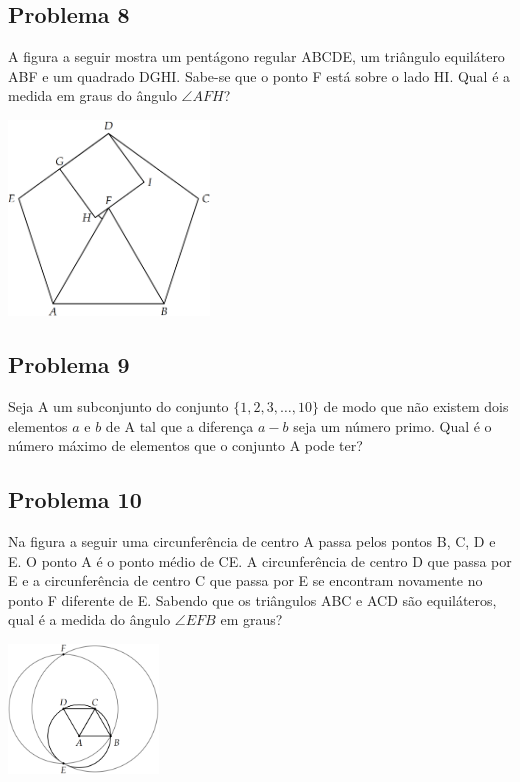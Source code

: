 \documentclass[12pt]{article}
\begin{document}
\clearpage

\subsection{Problema 8}
\begin{tcolorbox}[statementbox]
A figura a seguir mostra um pentágono regular ABCDE, um triângulo equilátero ABF e um quadrado DGHI. Sabe-se que o ponto F está
sobre o lado HI. Qual é a medida em graus do ângulo \(\angle AFH\)?
\begin{center}
  \includegraphics[width=0.4\textwidth]{third.png}
\end{center}
\end{tcolorbox}

\clearpage

\subsection{Problema 9}
\begin{tcolorbox}[statementbox]
Seja A um subconjunto do conjunto \(\{1, 2, 3, \dots, 10\}\) de modo que não existem dois elementos \(a\) e \(b\) de A tal
que a diferença \(a-b\) seja um número primo. Qual é o número máximo de elementos que o conjunto A pode ter?
\end{tcolorbox}

\clearpage

\subsection{Problema 10}
\begin{tcolorbox}[statementbox]
Na figura a seguir uma circunferência de centro A passa pelos pontos B, C, D e E. O ponto A é o ponto médio de CE. A 
circunferência de centro D que passa por E e a circunferência de centro C que passa por E se encontram novamente no ponto F
diferente de E. Sabendo que os triângulos ABC e ACD são equiláteros, qual é a medida do ângulo \(\angle EFB\) em graus?
\begin{center}
  \includegraphics[width=0.3\textwidth]{fourth.png}
\end{center}
\end{tcolorbox}
\end{document}
